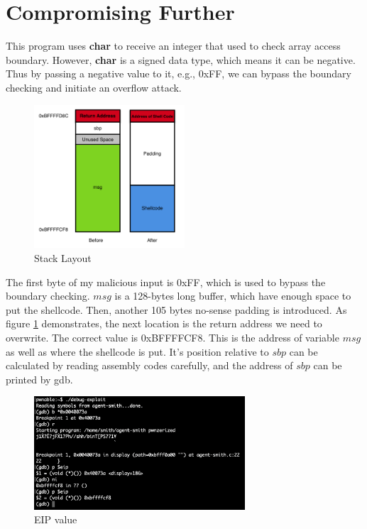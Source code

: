 \documentclass{article}
\begin{document}
\newpage
\section{Compromising Further}

This program uses \textbf{char} to receive an integer that used to check array access boundary. However, \textbf{char}
 is a signed data type, which means it can be negative. Thus by passing a negative value to it, e.g., 0xFF, we can bypass the boundary checking and initiate an overflow attack.
 
 \begin{figure}[h]
\centering
\includegraphics[width=0.5\textwidth]{stack2.png}
\caption{\label{fig:stack2}Stack Layout}
\end{figure}

The first byte of my malicious input is 0xFF, which is used to bypass the boundary checking. $msg$ is a 128-bytes long buffer, which have enough space to put the shellcode. Then, another 105 bytes no-sense padding is introduced. As figure \ref{fig:stack2} demonstrates, the next location is the return address we need to overwrite. The correct value is 0xBFFFFCF8. This is the address of variable $msg$ as well as where the shellcode is put. It's position relative to $sbp$ can be calculated by reading assembly codes carefully, and the address of $sbp$ can be printed by gdb.

\begin{figure}[h]
\centering
\includegraphics[width=0.7\textwidth]{gdb2.png}
\caption{\label{fig:gdb2}EIP value}
\end{figure}
\end{document}
